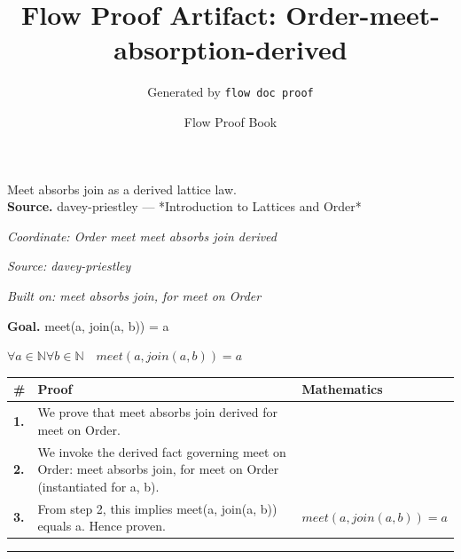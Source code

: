 \documentclass[11pt]{article}
\title{Flow Proof Artifact: Order-meet-absorption-derived}
\author{Generated by \texttt{flow doc proof}}
\date{Flow Proof Book}
\theoremstyle{definition}
\begin{document}
\maketitle
Meet absorbs join as a derived lattice law.\\[0.5em]
\textbf{Source.} davey-priestley — *Introduction to Lattices and Order*\\[0.5em]
\bigskip
{}\par
\smallskip\noindent\textit{Coordinate: Order \cdot meet \cdot meet absorbs join derived}\par
\smallskip\noindent\textit{Source: davey-priestley}\par
\smallskip\noindent\textit{Built on: meet absorbs join, for meet on Order}\par
\medskip
\noindent\textbf{Goal.} meet(a, join(a, b)) = a\par
\noindent$\displaystyle \forall a \in \mathbb{N} \forall b \in \mathbb{N}\quad meet(a, join(a, b)) = a$\par
\medskip
\noindent
\begin{tabular}{@{} >{\raggedright\arraybackslash}p{} >{\raggedright\arraybackslash}p{} >{\raggedleft\arraybackslash}p{} @{}}
\textbf{\#} & \textbf{Proof} & \textbf{Mathematics} \\
\midrule
\textbf{1.} & We prove that meet absorbs join derived for meet on Order. & \\[0.45em]
\textbf{2.} & We invoke the derived fact governing meet on Order: meet absorbs join, for meet on Order (instantiated for a, b). & \\[0.45em]
\textbf{3.} & From step 2, this implies meet(a, join(a, b)) equals a. Hence proven. & $\displaystyle meet(a, join(a, b)) = a$ \\[0.45em]
\bottomrule
\end{tabular}
\label{thm:Order-meet-meet_absorbs_join_derived}
\par\medskip\hrule
\end{document}
